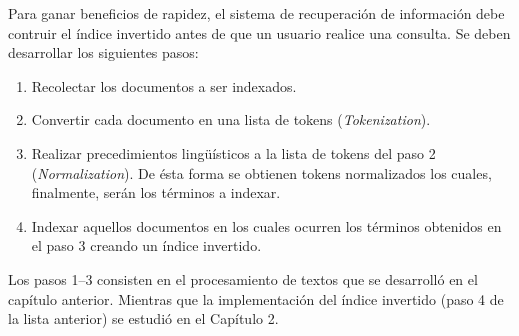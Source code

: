 		Para ganar beneficios de rapidez, el sistema de recuperación de información debe contruir el índice invertido antes de que un usuario realice una consulta. Se deben desarrollar los siguientes pasos:
		\begin{enumerate}
			\item Recolectar los documentos a ser indexados.
			\item Convertir cada documento en una lista de tokens (\textit{Tokenization}).
			\item Realizar precedimientos lingüísticos a la lista de tokens del paso 2 (\textit{Normalization}). De ésta forma se obtienen tokens normalizados los cuales, finalmente, serán los términos a indexar.
			\item Indexar aquellos documentos en los cuales ocurren los términos obtenidos en el paso 3 creando un índice invertido.
		\end{enumerate}
		Los pasos 1--3 consisten en el procesamiento de textos que se desarrolló en el capítulo anterior. Mientras que la implementación del índice invertido (paso 4 de la lista anterior) se estudió en el Capítulo 2.
		
		
